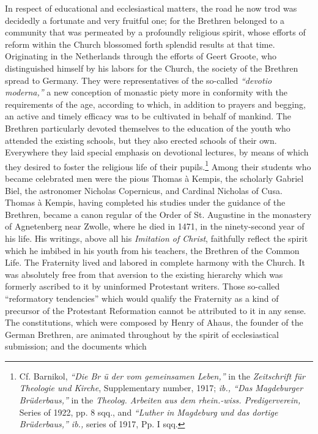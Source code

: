 In respect of educational and ecclesiastical matters, the road he
now trod was decidedly a fortunate and very fruitful one; for the
Brethren belonged to a community that was permeated by a profoundly religious spirit, whose efforts of reform within the Church
blossomed forth splendid results at that time. Originating in the
Netherlands through the efforts of Geert Groote, who distinguished
himself by his labors for the Church, the society of the Brethren
spread to Germany. They were representatives of the so-called
\textit{“devotio moderna,”} a new conception of monastic piety more in
conformity with the requirements of the age, according to which,
in addition to prayers and begging, an active and timely efficacy
was to be cultivated in behalf of mankind. The Brethren particularly
devoted themselves to the education of the youth who attended the
existing schools, but they also erected schools of their own. Everywhere they laid special emphasis on devotional lectures, by means of
which they desired to foster the religious life of their pupils.\footnote{Cf. Barnikol, \textit{``Die Br ü der vom gemeinsamen Leben,''} in the \textit{Zeitschrift für Theologie
und Kirche}, Supplementary number, 1917; \textit{ib., “Das Magdeburger Brüderbaus,”} in the
\textit{Theolog. Arbeiten aus dem rhein.-wiss. Predigerverein,} Series of 1922, pp. 8 sqq., and
\textit{“Luther in Magdeburg und das dortige Brüderbaus,” ib.,} series of 1917, Pp. I sqq.
}
Among
their students who became celebrated men were the pious Thomas à
Kempis, the scholarly Gabriel Biel, the astronomer Nicholas Copernicus, and Cardinal Nicholas of Cusa. Thomas à Kempis, having
completed his studies under the guidance of the Brethren, became
a canon regular of the Order of St. Augustine in the monastery of
Agnetenberg near Zwolle, where he died in 1471, in the ninety-second year of his life.
His writings, above all his \textit{Imitation of Christ},
faithfully reflect the spirit which he imbibed in his youth from his
teachers, the Brethren of the Common Life. The Fraternity lived and
labored in complete harmony with the Church. It was absolutely
free from that aversion to the existing hierarchy which was formerly
ascribed to it by uninformed Protestant writers. Those so-called
“reformatory tendencies” which would qualify the Fraternity as a
kind of precursor of the Protestant Reformation cannot be attributed
to it in any sense. The constitutions, which were composed by Henry
of Ahaus, the founder of the German Brethren, are animated throughout by the spirit of ecclesiastical submission; and the documents which
